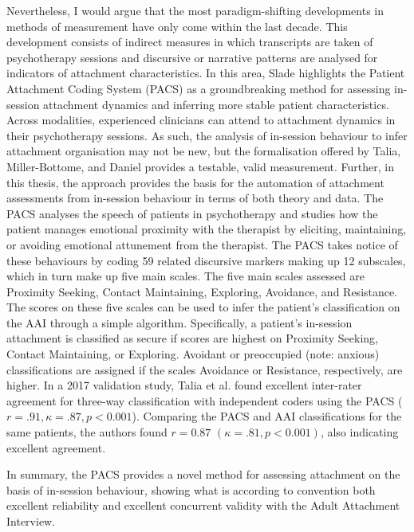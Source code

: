 \documentclass[12pt]{report}
\begin{document}
Nevertheless, I would argue that the most paradigm-shifting developments in methods of measurement have only come within the last decade.
This development consists of indirect measures in which transcripts are taken of psychotherapy sessions and discursive or narrative patterns are analysed for indicators of attachment characteristics.
In this area, Slade \citeyear{Slade2016} highlights the Patient Attachment Coding System (PACS) as a groundbreaking method for assessing in-session attachment dynamics and inferring more stable patient characteristics.
Across modalities, experienced clinicians can attend to attachment dynamics in their psychotherapy sessions.
As such, the analysis of in-session behaviour to infer attachment organisation may not be new, but the formalisation offered by Talia, Miller-Bottome, and Daniel \cite{Talia2017, Talia2014} provides a testable, valid measurement. Further, in this thesis, the approach provides the basis for the automation of attachment assessments from in-session behaviour in terms of both theory and data.
The PACS analyses the speech of patients in psychotherapy and studies how the patient manages emotional proximity with the therapist by eliciting, maintaining, or avoiding emotional attunement from the therapist.
The PACS takes notice of these behaviours by coding 59 related discursive markers making up 12 subscales, which in turn make up five main scales.
The five main scales assessed are Proximity Seeking, Contact Maintaining, Exploring, Avoidance, and Resistance.
The scores on these five scales can be used to infer the patient's classification on the AAI through a simple algorithm.
Specifically, a patient's in-session attachment is classified as secure if scores are highest on Proximity Seeking, Contact Maintaining, or Exploring. Avoidant or preoccupied (note: anxious) classifications are assigned if the scales Avoidance or Resistance, respectively, are higher.
In a 2017 validation study, Talia et al. \citeyear{Talia2017} found excellent inter-rater agreement for three-way classification with independent coders using the PACS ($r=.91, \kappa = .87, p<0.001$).
Comparing the PACS and AAI classifications for the same patients, the authors found $r=0.87$ $(\kappa = .81, p<0.001)$, also indicating excellent agreement.

In summary, the PACS provides a novel method for assessing attachment on the basis of in-session behaviour, showing what is according to convention \cite{Cicchetti1994} both excellent reliability and excellent concurrent validity with the Adult Attachment Interview.
\end{document}
